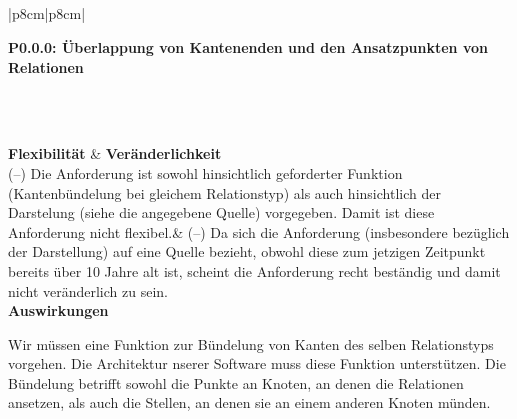 \documentclass[enabledeprecatedfontcommands,fontsize=11pt,paper=a4,twoside]{scrartcl}
\newcounter{one}
\newcounter{two}[one]
\newcounter{three}[two]
\newcommand{\tone}{0\theone}
\newcommand{\ttwo}{0\thetwo}
\newcommand{\three}{\stepcounter{three}0\thethree}
\begin{document}
\\ \\ \\ \\ %
\begin{tabular} {|p{8cm}|p{8cm}|}
	\hline
	 {\parbox{16cm}{\textbf{\hypertarget{cc}{P\tone.\ttwo.\three}: Überlappung von Kantenenden und den Ansatzpunkten von Relationen}} } \\  \hline\hline 
	\rule{0pt}{11ex}\\ [3ex] \hline
	\textbf{Flexibilität}  & \textbf{Veränderlichkeit} \\
	(–) Die Anforderung ist sowohl hinsichtlich geforderter Funktion (Kantenbündelung bei gleichem Relationstyp) als auch hinsichtlich der Darstelung (siehe die angegebene Quelle) vorgegeben. Damit ist diese Anforderung nicht flexibel.& 
	(–) Da sich die Anforderung (insbesondere bezüglich der Darstellung) auf eine Quelle bezieht, obwohl diese zum jetzigen Zeitpunkt bereits über 10 Jahre alt ist, scheint die Anforderung recht beständig und damit nicht veränderlich zu sein.\\
	\hline
	 {\textbf{Auswirkungen}} \\
	 {\parbox{16cm}{Wir müssen eine Funktion zur Bündelung von Kanten des selben Relationstyps vorgehen. Die Architektur nserer Software muss diese Funktion unterstützen. Die Bündelung betrifft sowohl die Punkte an Knoten, an denen die Relationen ansetzen, als auch die Stellen, an denen sie an einem anderen Knoten münden.} }\\ \hline
\end{tabular}
\\ \\%
\newpage
\end{document}
